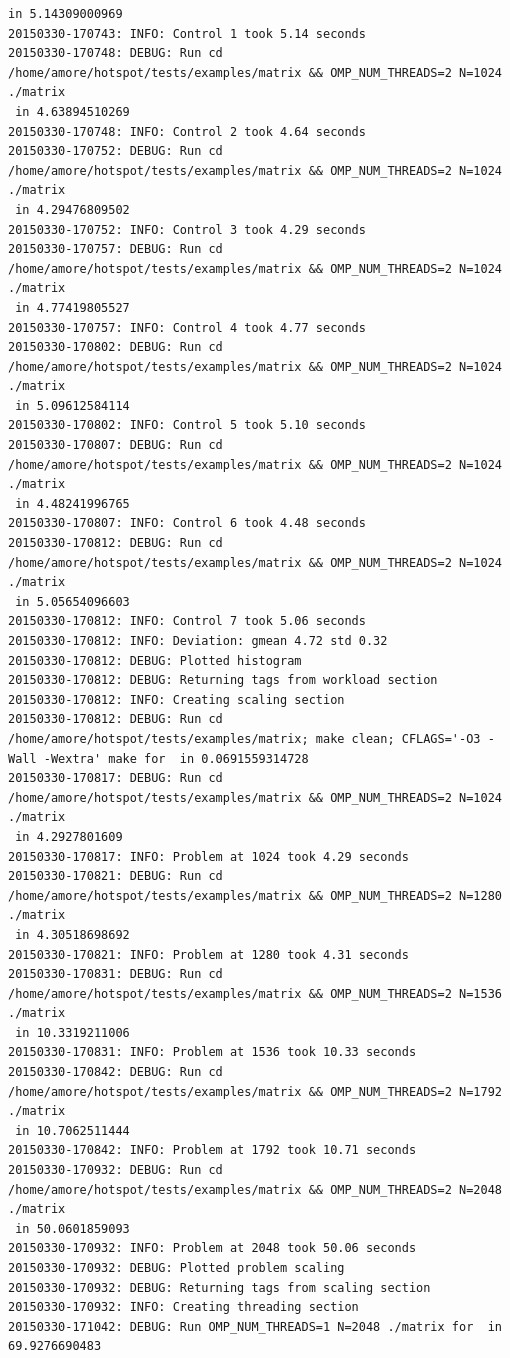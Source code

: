 \documentclass[a4paper]{report}
\begin{document}
\begin{lstlisting}[caption={Salida de Ejemplo},basicstyle=\tiny,label={lst:log}]
 in 5.14309000969
20150330-170743: INFO: Control 1 took 5.14 seconds
20150330-170748: DEBUG: Run cd /home/amore/hotspot/tests/examples/matrix && OMP_NUM_THREADS=2 N=1024 ./matrix
 in 4.63894510269
20150330-170748: INFO: Control 2 took 4.64 seconds
20150330-170752: DEBUG: Run cd /home/amore/hotspot/tests/examples/matrix && OMP_NUM_THREADS=2 N=1024 ./matrix
 in 4.29476809502
20150330-170752: INFO: Control 3 took 4.29 seconds
20150330-170757: DEBUG: Run cd /home/amore/hotspot/tests/examples/matrix && OMP_NUM_THREADS=2 N=1024 ./matrix
 in 4.77419805527
20150330-170757: INFO: Control 4 took 4.77 seconds
20150330-170802: DEBUG: Run cd /home/amore/hotspot/tests/examples/matrix && OMP_NUM_THREADS=2 N=1024 ./matrix
 in 5.09612584114
20150330-170802: INFO: Control 5 took 5.10 seconds
20150330-170807: DEBUG: Run cd /home/amore/hotspot/tests/examples/matrix && OMP_NUM_THREADS=2 N=1024 ./matrix
 in 4.48241996765
20150330-170807: INFO: Control 6 took 4.48 seconds
20150330-170812: DEBUG: Run cd /home/amore/hotspot/tests/examples/matrix && OMP_NUM_THREADS=2 N=1024 ./matrix
 in 5.05654096603
20150330-170812: INFO: Control 7 took 5.06 seconds
20150330-170812: INFO: Deviation: gmean 4.72 std 0.32
20150330-170812: DEBUG: Plotted histogram
20150330-170812: DEBUG: Returning tags from workload section
20150330-170812: INFO: Creating scaling section
20150330-170812: DEBUG: Run cd /home/amore/hotspot/tests/examples/matrix; make clean; CFLAGS='-O3 -Wall -Wextra' make for  in 0.0691559314728
20150330-170817: DEBUG: Run cd /home/amore/hotspot/tests/examples/matrix && OMP_NUM_THREADS=2 N=1024 ./matrix
 in 4.2927801609
20150330-170817: INFO: Problem at 1024 took 4.29 seconds
20150330-170821: DEBUG: Run cd /home/amore/hotspot/tests/examples/matrix && OMP_NUM_THREADS=2 N=1280 ./matrix
 in 4.30518698692
20150330-170821: INFO: Problem at 1280 took 4.31 seconds
20150330-170831: DEBUG: Run cd /home/amore/hotspot/tests/examples/matrix && OMP_NUM_THREADS=2 N=1536 ./matrix
 in 10.3319211006
20150330-170831: INFO: Problem at 1536 took 10.33 seconds
20150330-170842: DEBUG: Run cd /home/amore/hotspot/tests/examples/matrix && OMP_NUM_THREADS=2 N=1792 ./matrix
 in 10.7062511444
20150330-170842: INFO: Problem at 1792 took 10.71 seconds
20150330-170932: DEBUG: Run cd /home/amore/hotspot/tests/examples/matrix && OMP_NUM_THREADS=2 N=2048 ./matrix
 in 50.0601859093
20150330-170932: INFO: Problem at 2048 took 50.06 seconds
20150330-170932: DEBUG: Plotted problem scaling
20150330-170932: DEBUG: Returning tags from scaling section
20150330-170932: INFO: Creating threading section
20150330-171042: DEBUG: Run OMP_NUM_THREADS=1 N=2048 ./matrix for  in 69.9276690483

\end{lstlisting}
\end{document}
